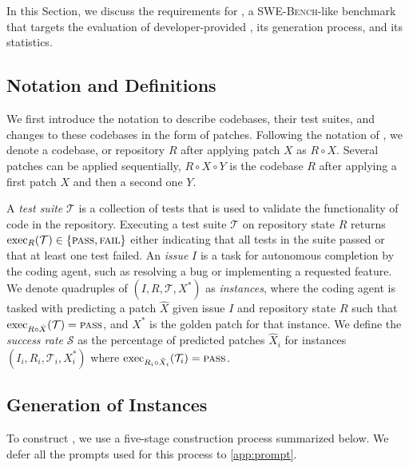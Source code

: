 \section{\planbench{}}
\label{sec:method}

In this Section, we discuss the requirements for \planbench{}, a \textsc{SWE-Bench}-like benchmark that targets the evaluation of developer-provided \agentsmds{}, its generation process, and its statistics.

\subsection{Notation and Definitions}
\label{sec:notation-success}
We first introduce the notation to describe codebases, their test suites, and changes to these codebases in the form of patches.
Following the notation of \citet{mundler2024swt}, we denote a codebase, or repository $R$ after applying patch $X$ as $R \circ X$.
Several patches can be applied sequentially, \ie{} $R \circ X \circ Y$ is the codebase $R$ after applying a first patch $X$ and then a second one $Y$.

\newcommand{\myexec}{\mathrm{exec}}
\newcommand{\dvS}{\mathcal{S}}
\newcommand{\dvT}{\mathcal{T}}
A \emph{test suite} $\dvT$ is a collection of tests that is used to validate the functionality of code in the repository.
Executing a test suite $\dvT$ on repository state $R$ returns $\myexec_R(\dvT) \in \{\textsc{pass}, \textsc{fail}\}$ either indicating that all tests in the suite passed or that at least one test failed.
An \emph{issue} $I$ is a task for autonomous completion by the coding agent, such as resolving a bug or implementing a requested feature.
We denote quadruples of $(I, R, \dvT, X^{*})$ as \emph{instances}, where the coding agent is tasked with predicting a patch $\hat{X}$ given issue $I$ and repository state $R$ such that $\myexec_{R \circ \hat{X}}(\dvT) = \textsc{pass}$, and $X^{*}$ is the golden patch for that instance.
We define the \emph{success rate} $\dvS$ as the percentage of predicted patches $\hat{X}_i$ for instances $(I_i, R_i, \dvT_i, X^{*}_i)$ where $\myexec_{R_i \circ \hat{X}_i}(\dvT_i) = \textsc{pass}$.


\subsection{Generation of \planbench{} Instances}
To construct \planbench{}, we use a five-stage construction process summarized below. 
We defer all the prompts used for this process to \cref{app:prompt}.

